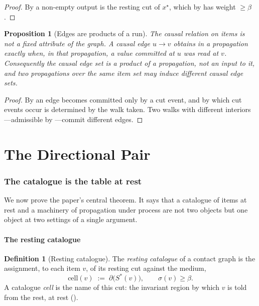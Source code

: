 \documentclass[11pt,twocolumn,a4paper]{article}
\theoremstyle{dirthm}
\newtheorem{proposition}[theorem]{Proposition}
\theoremstyle{definition}
\newtheorem{definition}[theorem]{Definition}
\theoremstyle{remark}
\newcommand{\flo}{\beta}
\newcommand{\cut}{\partial}
\newcommand{\str}{\sigma}
\newcommand{\cell}{\mathrm{cell}}
\begin{document}
\begin{proof}
By  a non-empty output is the resting cut of $x^{\star}$,
which by  has weight $\ge\flo$.
\end{proof}

\begin{proposition}[Edges are products of a run]
\label{prop:no-edges}
The causal relation on items is not a fixed attribute of the graph. A causal
edge $u\to v$ obtains in a propagation exactly when, in that propagation, a
value committed at $u$ was read at $v$. Consequently the causal edge set is a
product of a propagation, not an input to it, and two propagations over the
same item set may induce different causal edge sets.
\end{proposition}

\begin{proof}
By  an edge becomes committed only by a cut event, and by
 which cut events occur is determined by the walk taken.
Two walks with different interiors---admissible by
---commit different edges.
\end{proof}

\part{The Directional Pair}
\label{part:pair}

\section{The catalogue is the table at rest}
\label{sec:directional}

We now prove the paper's central theorem. It says that a catalogue of items
at rest and a machinery of propagation under process are not two objects but
one object at two settings of a single argument.

\subsection{The resting catalogue}

\begin{definition}[Resting catalogue]
\label{def:catalogue}
The \emph{resting catalogue} of a contact graph is the assignment, to each
item $v$, of its resting cut against the medium,
\[
\cell(v)\;:=\;\cut\bigl(S^{\ast}(v)\bigr),\qquad \str(v)\ge\flo.
\]
A catalogue \emph{cell} is the name of this cut: the invariant region by
which $v$ is told from the rest, at rest ().
\end{definition}
\end{document}
